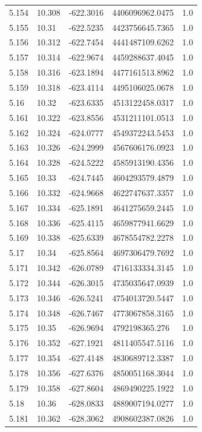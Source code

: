 \begin{tabular}{lllll}
5.154 & 10.308 & -622.3016 & 4406096962.0475 & 1.0 \\
5.155 & 10.31 & -622.5235 & 4423756645.7365 & 1.0 \\
5.156 & 10.312 & -622.7454 & 4441487109.6262 & 1.0 \\
5.157 & 10.314 & -622.9674 & 4459288637.4045 & 1.0 \\
5.158 & 10.316 & -623.1894 & 4477161513.8962 & 1.0 \\
5.159 & 10.318 & -623.4114 & 4495106025.0678 & 1.0 \\
5.16 & 10.32 & -623.6335 & 4513122458.0317 & 1.0 \\
5.161 & 10.322 & -623.8556 & 4531211101.0513 & 1.0 \\
5.162 & 10.324 & -624.0777 & 4549372243.5453 & 1.0 \\
5.163 & 10.326 & -624.2999 & 4567606176.0923 & 1.0 \\
5.164 & 10.328 & -624.5222 & 4585913190.4356 & 1.0 \\
5.165 & 10.33 & -624.7445 & 4604293579.4879 & 1.0 \\
5.166 & 10.332 & -624.9668 & 4622747637.3357 & 1.0 \\
5.167 & 10.334 & -625.1891 & 4641275659.2445 & 1.0 \\
5.168 & 10.336 & -625.4115 & 4659877941.6629 & 1.0 \\
5.169 & 10.338 & -625.6339 & 4678554782.2278 & 1.0 \\
5.17 & 10.34 & -625.8564 & 4697306479.7692 & 1.0 \\
5.171 & 10.342 & -626.0789 & 4716133334.3145 & 1.0 \\
5.172 & 10.344 & -626.3015 & 4735035647.0939 & 1.0 \\
5.173 & 10.346 & -626.5241 & 4754013720.5447 & 1.0 \\
5.174 & 10.348 & -626.7467 & 4773067858.3165 & 1.0 \\
5.175 & 10.35 & -626.9694 & 4792198365.276 & 1.0 \\
5.176 & 10.352 & -627.1921 & 4811405547.5116 & 1.0 \\
5.177 & 10.354 & -627.4148 & 4830689712.3387 & 1.0 \\
5.178 & 10.356 & -627.6376 & 4850051168.3044 & 1.0 \\
5.179 & 10.358 & -627.8604 & 4869490225.1922 & 1.0 \\
5.18 & 10.36 & -628.0833 & 4889007194.0277 & 1.0 \\
5.181 & 10.362 & -628.3062 & 4908602387.0826 & 1.0 \\

\end{tabular}
